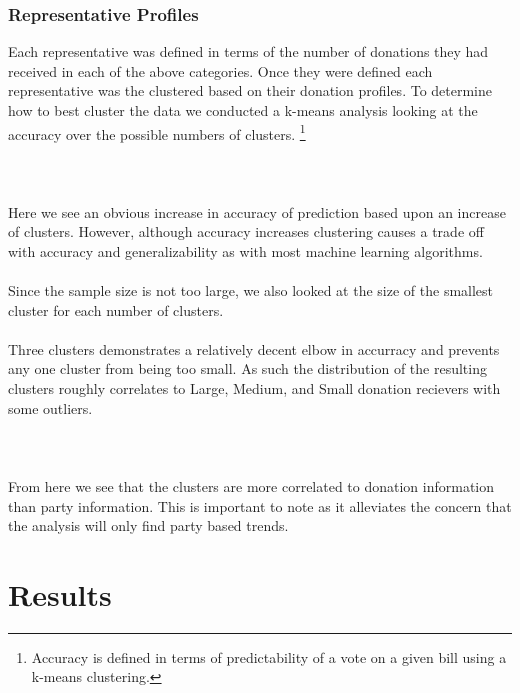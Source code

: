 \documentclass[journal]{IEEEtran}
\begin{document}
\subsubsection{Representative Profiles}
Each representative was defined in terms of the number of donations they had received in each of the above
categories. Once they were defined each representative was the clustered based on their donation profiles.
To determine how to best cluster the data we conducted a k-means analysis looking at the accuracy over the 
possible numbers of clusters.
\footnote{Accuracy is defined in terms of predictability of a vote on a given bill using a k-means clustering.}\\\\
\\
\\Here we see an obvious increase in accuracy of prediction based upon an increase of clusters. However, although accuracy increases
clustering causes a trade off with accuracy and generalizability as with most machine learning algorithms.\\\\
Since the sample size is not too large, we also looked at the size of the smallest cluster for each number of clusters.\\
\\

Three clusters demonstrates a relatively decent elbow in accurracy and prevents any one cluster from being too small. As such
the distribution of the resulting clusters roughly correlates to Large, Medium, and Small donation recievers with some outliers.\\\\
\\\\
From here we see that the clusters are more correlated to donation information than party information. This is important to note
as it alleviates the concern that the analysis will only find party based trends.
\section{Results}
\end{document}
